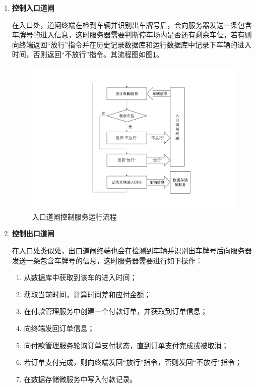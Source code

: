 \documentclass[a4paper]{ctexart}
\begin{document}
\begin{enumerate}[label=\bf{\arabic*、}]
	\item {\bf 控制入口道闸}

	      在入口处，道闸终端在检到车辆并识别出车牌号后，会向服务器发送一条包含车牌号的进入信息，这时服务器需要判断停车场内是否还有剩余车位，若有则向终端返回“放行”指令并在历史记录数据库和运行数据库中记录下车辆的进入时间，否则返回“不放行”指令。其流程图如图\ref{fig:入口道闸控制运行流程}。

	      \begin{figure}[htbp]
		      \centering
		      \includegraphics[width=\textwidth]{figure/server-enter.pdf}
		      \caption{入口道闸控制服务运行流程}\label{fig:入口道闸控制运行流程}
	      \end{figure}

	\item {\bf 控制出口道闸}

	      在入口处类似处，出口道闸终端也会在检测到车辆并识别出车牌号后向服务器发送一条包含车牌号的信息，这时服务器需要进行如下操作：
	      \begin{enumerate}[label=\arabic*、]
		      \item 从数据库中获取到该车的进入时间；
		      \item 获取当前时间，计算时间差和应付金额；
		      \item 在付款管理服务中创建一个付款订单，并获取到订单信息；
		      \item 向终端发回订单信息；
		      \item 向付款管理服务轮询订单支付状态，直到订单支付完成或被取消；
		      \item 若订单支付完成，则向终端发回“放行”指令，否则发回“不放行”指令；
		      \item 在数据存储微服务中写入付款记录。
	      \end{enumerate}


\end{enumerate}
\end{document}

